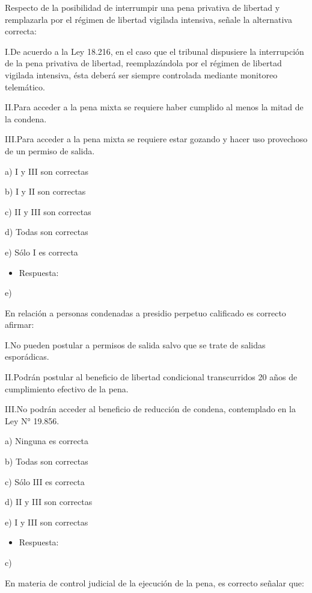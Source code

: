 \documentclass[letterpaper, 11pt]{article}
\begin{document}
Respecto de la posibilidad de interrumpir una pena privativa de
libertad y remplazarla por el régimen de libertad vigilada intensiva,
señale la alternativa correcta:


I.De acuerdo a la Ley 18.216, en el caso que el tribunal dispusiere la
interrupción de la pena privativa de libertad, reemplazándola por el
régimen de libertad vigilada intensiva, ésta deberá ser siempre
controlada mediante monitoreo telemático.



II.Para acceder a la pena mixta se requiere haber cumplido al menos
la mitad de la condena.

III.Para acceder a la pena mixta se requiere estar gozando y hacer uso
provechoso de un permiso de salida.


a) I y III son correctas

b) I y II son correctas

c) II y III son correctas

d) Todas son correctas

e) Sólo I es correcta


\begin{itemize}
\item Respuesta:
\end{itemize}

e)



En relación a personas condenadas a presidio perpetuo calificado es
correcto afirmar:


I.No pueden postular a permisos de salida salvo que se trate de
salidas esporádicas.

II.Podrán postular al beneficio de libertad condicional transcurridos
20 años de cumplimiento efectivo de la pena.

III.No podrán acceder al beneficio de reducción de condena,
contemplado en la Ley N° 19.856.


a) Ninguna es correcta

b) Todas son correctas

c) Sólo III es correcta

d) II y III son correctas

e) I y III son correctas


\begin{itemize}
\item Respuesta:
\end{itemize}

c)


En materia de control judicial de la ejecución de la pena, es correcto
señalar que:
\end{document}
